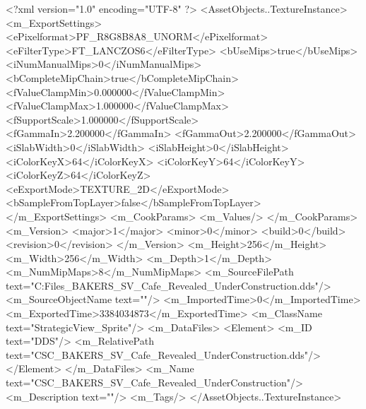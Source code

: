 <?xml version="1.0" encoding="UTF-8" ?>
<AssetObjects..TextureInstance>
	<m_ExportSettings>
		<ePixelformat>PF_R8G8B8A8_UNORM</ePixelformat>
		<eFilterType>FT_LANCZOS6</eFilterType>
		<bUseMips>true</bUseMips>
		<iNumManualMips>0</iNumManualMips>
		<bCompleteMipChain>true</bCompleteMipChain>
		<fValueClampMin>0.000000</fValueClampMin>
		<fValueClampMax>1.000000</fValueClampMax>
		<fSupportScale>1.000000</fSupportScale>
		<fGammaIn>2.200000</fGammaIn>
		<fGammaOut>2.200000</fGammaOut>
		<iSlabWidth>0</iSlabWidth>
		<iSlabHeight>0</iSlabHeight>
		<iColorKeyX>64</iColorKeyX>
		<iColorKeyY>64</iColorKeyY>
		<iColorKeyZ>64</iColorKeyZ>
		<eExportMode>TEXTURE_2D</eExportMode>
		<bSampleFromTopLayer>false</bSampleFromTopLayer>
	</m_ExportSettings>
	<m_CookParams>
		<m_Values/>
	</m_CookParams>
	<m_Version>
		<major>1</major>
		<minor>0</minor>
		<build>0</build>
		<revision>0</revision>
	</m_Version>
	<m_Height>256</m_Height>
	<m_Width>256</m_Width>
	<m_Depth>1</m_Depth>
	<m_NumMipMaps>8</m_NumMipMaps>
	<m_SourceFilePath text="C:\Users\Shadow\Desktop\Working Files\Icons\StrategicView\CSC_BAKERS_SV_Cafe_Revealed_UnderConstruction.dds"/>
	<m_SourceObjectName text=""/>
	<m_ImportedTime>0</m_ImportedTime>
	<m_ExportedTime>3384034873</m_ExportedTime>
	<m_ClassName text="StrategicView_Sprite"/>
	<m_DataFiles>
		<Element>
			<m_ID text="DDS"/>
			<m_RelativePath text="CSC_BAKERS_SV_Cafe_Revealed_UnderConstruction.dds"/>
		</Element>
	</m_DataFiles>
	<m_Name text="CSC_BAKERS_SV_Cafe_Revealed_UnderConstruction"/>
	<m_Description text=""/>
	<m_Tags/>
</AssetObjects..TextureInstance>

